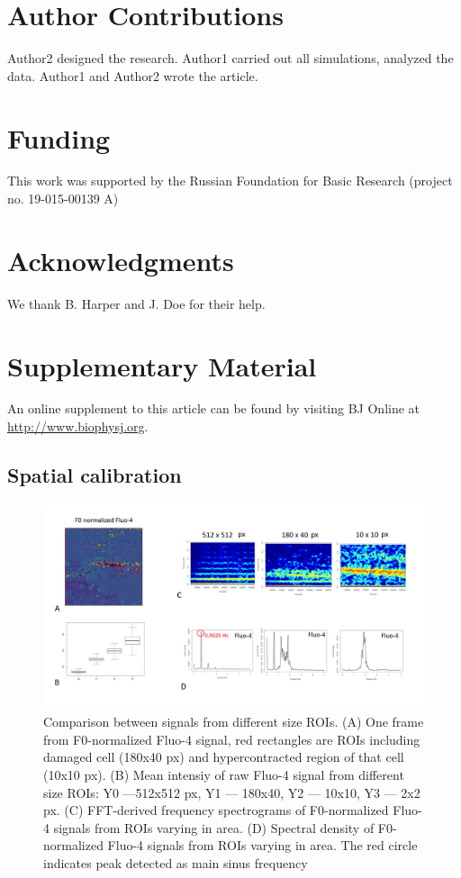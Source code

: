 \documentclass{biophys-new}
\begin{document}
\section*{Author Contributions}
Author2 designed the research. Author1 carried out all simulations, analyzed the data. Author1 and Author2 wrote the article.

\section*{Funding}
This work was supported by the Russian Foundation for Basic Research (project no. 19-015-00139 A)

\section*{Acknowledgments}
We thank B. Harper and J. Doe for their help.




\section*{Supplementary Material}
An online supplement to this article can be found by visiting BJ Online at \url{http://www.biophysj.org}.

\subsection*{Spatial calibration}

\begin{figure}
    \includegraphics[width=0.9\linewidth]{fig3.png}
    \caption{Comparison between signals from different size ROIs. (A) One frame from F0-normalized Fluo-4 signal, red rectangles are  ROIs including damaged cell (180x40 px) and hypercontracted region of that cell (10x10 px). (B) Mean intensiy of raw Fluo-4 signal from different size ROIs: Y0 ---512x512 px, Y1 --- 180x40, Y2 --- 10x10, Y3 --- 2x2 px. (C) FFT-derived frequency spectrograms of F0-normalized Fluo-4 signals from ROIs varying in area. (D) Spectral density of F0-normalized Fluo-4 signals from ROIs varying in area. The red circle indicates peak detected as main sinus frequency }
    \label{fig:fig3}
\end{figure}
\end{document}
